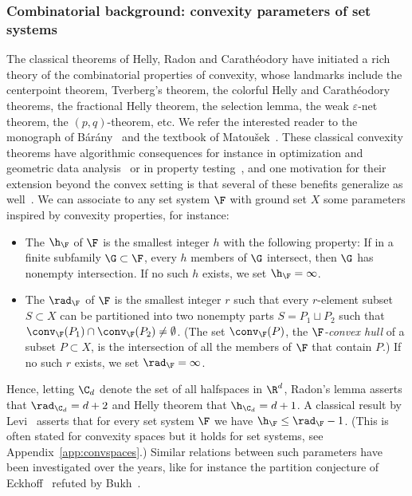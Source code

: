 \subsubsection{Combinatorial background: convexity parameters of set systems}\label{s:cbk}
%
The classical theorems of Helly, Radon and Carathéodory have initiated a rich theory of the combinatorial properties of convexity, whose landmarks include the centerpoint theorem, Tverberg's theorem, the colorful Helly and Carathéodory theorems, the fractional Helly theorem, the selection lemma, the weak $\varepsilon$-net theorem, the $(p,q)$-theorem, etc. We refer the interested reader to the monograph of Bárány~\cite{barany2021combinatorial} and the textbook of Matou\v{s}ek~\cite{matousek2013lectures}. These classical convexity theorems have algorithmic consequences for instance in optimization and geometric data analysis~\cite[$\mathsection~6-7$]{de2019discrete} or in property testing~\cite{chakraborty2018helly}, and one motivation for their extension beyond the convex setting is that several of these benefits generalize as well~\cite{msw-sblp-92,epstein_et_al:LIPIcs.ICALP.2020.98}.
%
\medskip
%
We can associate to any set system $\F$ with ground set $X$ some parameters inspired by convexity properties, for instance:
%
\begin{itemize}
\item The  $\h_\F$ of $\F$ is the smallest integer $h$ with the following property: If in a finite subfamily $\G \subset\F$, every $h$ members of $\G$ intersect, then $\G$ has nonempty intersection. If no such $h$ exists, we set $\h_\F=\infty$.\medskip
%
\item The  $\rad_\F$ of $\F$ is the smallest integer $r$ such that every $r$-element subset $S\subset X$ can be partitioned into two nonempty parts $S=P_1\sqcup P_2$ such that $\conv_{\F}(P_1) \cap \conv_{\F}(P_2) \neq \emptyset$. (The set $\conv_{\F}(P)$, the \emph{$\F$-convex hull} of a subset $P\subset X$, is the intersection of all the members of $\F$ that contain $P$.) If no such $r$ exists, we set $\rad_\F=\infty$.
\end{itemize}
%
\noindent
Hence, letting $\C_d$ denote the set of all halfspaces in $\R^d$, Radon's lemma asserts that $\rad_{\C_d} = d+2$ and Helly theorem that $\h_{\C_d} = d+1$. A classical result by Levi~\cite{Levi_radon_implies_helly} asserts that for every set system $\F$ we have $\h_{\F} \leq \rad_\F-1$. (This is often stated for convexity spaces but it holds for set systems, see Appendix~\ref{app:convspaces}.) Similar relations between such parameters have been investigated over the years, like for instance the partition conjecture of Eckhoff~\cite{ECKHOFF200061} refuted by Bukh~\cite{bukh2010radon}.
